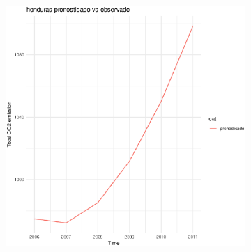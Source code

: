 \documentclass[twocolumn]{article}
\begin{document}
\begin{figure}
\begin{subfigure}{.3\textwidth}
        \end{subfigure}
        \hspace*{\fill}
        \begin{subfigure}{.3\textwidth}
            \includegraphics[width=\linewidth]{images/honduras_imputation.eps}
        \end{subfigure}
    \end{figure}
\end{document}
